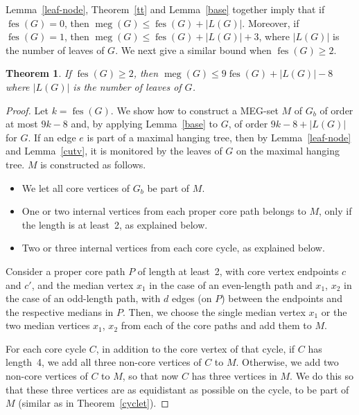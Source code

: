 \documentclass[10pt,a4paper]{amsart}
\theoremstyle{plain}
\newtheorem{theorem}{Theorem}
\theoremstyle{definition}
\DeclareMathOperator{\fes}{fes}
\DeclareMathOperator{\MEG}{meg}
\begin{document}
Lemma~\ref{leaf-node}, Theorem~\ref{tt} and Lemma~\ref{base} together imply that if $\fes(G) = 0$, then $\MEG(G) \leq \fes(G)+|L(G)|$. Moreover, if $\fes(G)=1$, then $\MEG(G) \leq \fes(G) + |L(G)| + 3$, where $|L(G)|$ is the number of leaves of $G$. We next give a similar bound when $\fes(G)\geq 2$.

\begin{theorem}\label{thm:fes}
If $\fes(G) \geq 2$, then $\MEG(G) \leq 9\fes(G) + |L(G)| - 8$ where $|L(G)|$ is the number of leaves of $G$.
\end{theorem}

\begin{proof}
Let $k = \fes(G)$. We show how to construct a MEG-set $M$ of $G_b$ of order at most $9k-8$ and, by applying Lemma~\ref{base} to $G$, of order $9k-8 + |L(G)|$ for $G$. If an edge $e$ is part of a maximal hanging tree, then by Lemma~\ref{leaf-node} and Lemma~\ref{cutv}, it is monitored by the leaves of $G$ on the maximal hanging tree. $M$ is constructed as follows. 
\begin{itemize}
    \item We let all core vertices of $G_b$ be part of $M$.
    \item One or two internal vertices from each proper core path belongs to $M$, only if the length is at least~2, as explained below.
    \item Two or three internal vertices from each core cycle, as explained below.
\end{itemize}

Consider a proper core path $P$ of length at least~2, with core vertex endpoints $c$ and $c'$, and the median vertex $x_1$ in the case of an even-length path and $x_1$, $x_2$ in the case of an odd-length path, with $d$ edges (on $P$) between the endpoints and the respective medians in $P$. Then, we choose the single median vertex $x_1$ or the two median vertices $x_1$, $x_2$ from each of the core paths and add them to $M$.

For each core cycle $C$, in addition to the core vertex of that cycle, if $C$ has length~4, we add all three non-core vertices of $C$ to $M$. Otherwise, we add two non-core vertices of $C$ to $M$, so that now $C$ has three vertices in $M$. We do this so that these three vertices are as equidistant as possible on the cycle, to be part of $M$ (similar as in Theorem~\ref{cyclet}). %


\end{proof}
\end{document}
